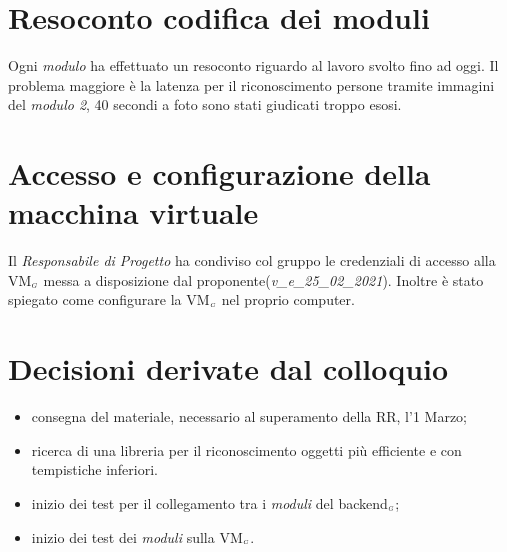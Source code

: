 \section{Resoconto codifica dei moduli}
Ogni \textit{modulo} ha effettuato un resoconto riguardo al lavoro svolto fino ad oggi.
Il problema maggiore è la latenza per il riconoscimento persone tramite immagini del \textit{modulo 2}, 40 secondi a foto sono stati giudicati troppo esosi.


\section{Accesso e configurazione della macchina virtuale}
Il \textit{Responsabile di Progetto} ha condiviso col gruppo le credenziali di accesso alla VM$_{\scaleto{G}{3pt}}$ messa a disposizione dal proponente(\textit{v_e_25_02_2021}).
Inoltre è stato spiegato come configurare la VM$_{\scaleto{G}{3pt}}$ nel proprio computer.

\section{Decisioni derivate dal colloquio}
  \begin{itemize}
    \item consegna del materiale, necessario al superamento della RR, l'1 Marzo;
    \item ricerca di una libreria per il riconoscimento oggetti più efficiente e con tempistiche inferiori.
    \item inizio dei test per il collegamento tra i \textit{moduli} del backend$_{\scaleto{G}{3pt}}$;
    \item inizio dei test dei \textit{moduli} sulla VM$_{\scaleto{G}{3pt}}$.
  \end{itemize}
